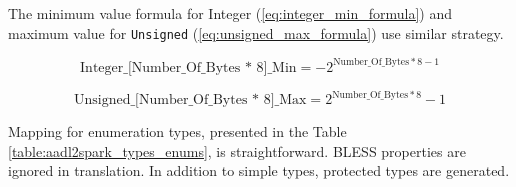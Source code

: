 The minimum value formula for Integer (\ref{eq:integer_min_formula}) and maximum value for \lstinline{Unsigned} (\ref{eq:unsigned_max_formula}) use similar strategy.

\begin{equation} \label{eq:integer_min_formula}
	\text{Integer\_[Number\_Of\_Bytes * 8]\_Min} = -2^{\text{Number\_Of\_Bytes} * 8 - 1}
\end{equation}

\begin{equation} \label{eq:unsigned_max_formula}
	\text{Unsigned\_[Number\_Of\_Bytes * 8]\_Max} = 2^{\text{Number\_Of\_Bytes} * 8} - 1
\end{equation}

Mapping for enumeration types, presented in the Table \ref{table:aadl2spark_types_enums}, is straightforward. BLESS properties are ignored in translation. In addition to simple types, protected types are generated.

